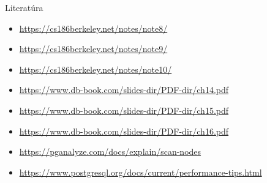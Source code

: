 \documentclass[12pt]{beamer}
\begin{document}
\begin{frame}{Literatúra}
\begin{itemize}
\item {\scriptsize\url{https://cs186berkeley.net/notes/note8/}}
\item {\scriptsize\url{https://cs186berkeley.net/notes/note9/}}
\item {\scriptsize\url{https://cs186berkeley.net/notes/note10/}}
\item {\scriptsize\url{https://www.db-book.com/slides-dir/PDF-dir/ch14.pdf}}
\item {\scriptsize\url{https://www.db-book.com/slides-dir/PDF-dir/ch15.pdf}}
\item {\scriptsize\url{https://www.db-book.com/slides-dir/PDF-dir/ch16.pdf}}
\item {\scriptsize\url{https://pganalyze.com/docs/explain/scan-nodes}}
\item {\scriptsize\url{https://www.postgresql.org/docs/current/performance-tips.html}}
\end{itemize}
\end{frame}
\end{document}
